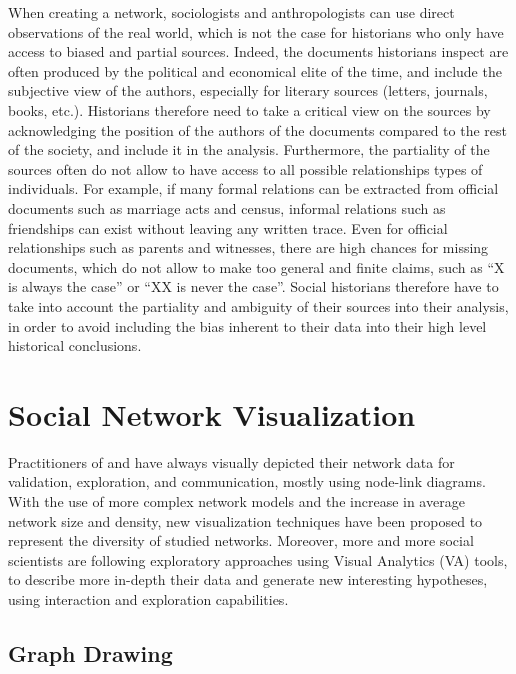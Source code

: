 When creating a network, sociologists and anthropologists can use direct observations of the real world, which is not the case for historians who only have access to biased and partial sources.
Indeed, the documents historians inspect are often produced by the political and economical elite of the time, and include the subjective view of the authors, especially for literary sources (letters, journals, books, etc.).
Historians therefore need to take a critical view on the sources by acknowledging the position of the authors of the documents compared to the rest of the society, and include it in the analysis\cite{lemercierQuantitativeMethodsHumanities2019}.
Furthermore, the partiality of the sources often do not allow to have access to all possible relationships types of individuals.
For example, if many formal relations can be extracted from official documents such as marriage acts and census, informal relations such as friendships can exist without leaving any written trace\cite{lemercier12FormalNetwork2015}.
Even for official relationships such as parents and witnesses, there are high chances for missing documents, which do not allow to make too general and finite claims, such as ``X is always the case'' or ``XX is never the case''\cite{alexanderAnalysisAncientNetwork1990}.
Social historians therefore have to take into account the partiality and ambiguity of their sources into their analysis, in order to avoid including the bias inherent to their data into their high level historical conclusions.




\section{Social Network Visualization}\label{sec:social-network-visualization}


Practitioners of \sna and \hsna have always visually depicted their network data for validation, exploration, and communication, mostly using node-link diagrams.
With the use of more complex network models and the increase in average network size and density, new visualization techniques have been proposed to represent the diversity of studied networks.
Moreover, more and more social scientists are following exploratory approaches using Visual Analytics (VA) tools, to describe more in-depth their data and generate new interesting hypotheses, using interaction and exploration capabilities.

\subsection{Graph Drawing}

